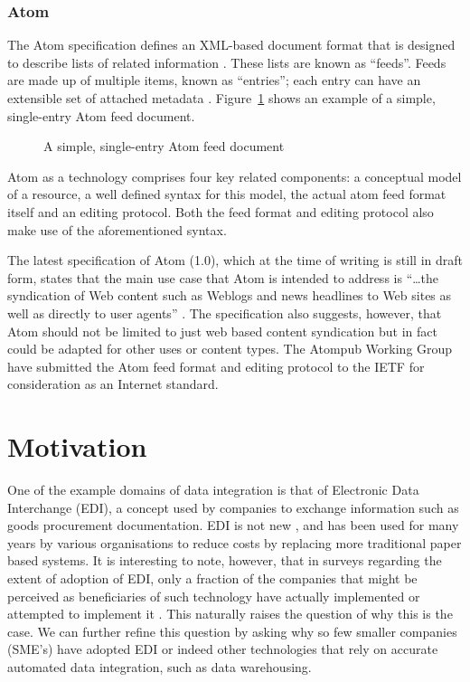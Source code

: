 \documentclass{CRPITStyle}
\begin{document}
\subsubsection{Atom}
\label{sec-atom-detail}

The Atom specification defines an XML-based document format that is
designed to describe lists of related information
\cite{Nott-M-2005-Atom}. These lists are known as ``feeds''. Feeds are
made up of multiple items, known as ``entries''; each entry can have an
extensible set of attached metadata \cite{Nott-M-2005-Atom}.
Figure~\ref{fig-atom-example} shows an example of a simple, single-entry
Atom feed document.


\begin{figure}
	\caption{A simple, single-entry Atom feed document \protect\cite{Nott-M-2005-Atom}}
	\label{fig-atom-example}
\end{figure}


Atom as a technology comprises four key related components: a conceptual
model of a resource, a well defined syntax for this model, the actual
atom feed format itself and an editing protocol. Both the feed format
and editing protocol also make use of the aforementioned syntax.

The latest specification of Atom (1.0), which at the time of writing is
still in draft form, states that the main use case that Atom is intended
to address is ``\ldots{}the syndication of Web content such as Weblogs
and news headlines to Web sites as well as directly to user agents''
\cite{Nott-M-2005-Atom}. The specification also suggests, however, that
Atom should not be limited to just web based content syndication but in
fact could be adapted for other uses or content types. The Atompub
Working Group have submitted the Atom feed format and editing protocol
to the IETF for consideration as an Internet standard.


\section{Motivation}
\label{sec-motivation}

One of the example domains of data integration is that of Electronic
Data Interchange (EDI), a concept used by companies to exchange
information such as goods procurement documentation. EDI is not new
\cite{Beck-R-2002-Bled,Medj-B-2003-VLDB}, and has been used for many
years by various organisations to reduce costs by replacing more
traditional paper based systems. It is interesting to note, however,
that in surveys regarding the extent of adoption of EDI, only a fraction
of the companies that might be perceived as beneficiaries of such
technology have actually implemented or attempted to implement it
\cite{Beck-R-2002-Bled,vaHe-E-1999-EDI}. This naturally raises the
question of why this is the case. We can further refine this question by
asking why so few smaller companies (SME's) have adopted EDI or indeed
other technologies that rely on accurate automated data integration,
such as data warehousing.
\end{document}
